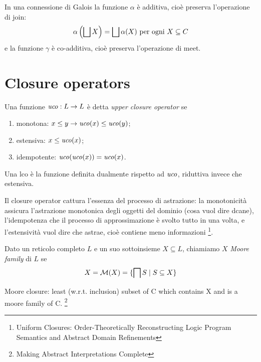 \begin{theorem}
In una connessione di Galois la funzione $\alpha$ è additiva, cioè preserva l'operazione di join: 
$$\alpha\left(\join[X]\right) = \join[\alpha(X)] \text{ per ogni } X \subseteq C$$
e la funzione $\gamma$ è co-additiva, cioè preserva l'operazione di meet.
\end{theorem}

\section{Closure operators}

\begin{definition}
Una funzione $\mathit{uco}: L \to L$ è detta \emph{upper closure operator} se
\begin{enumerate}
    \item monotona: $x \le y \to \mathit{uco}(x) \le \mathit{uco}(y)$;
    \item estensiva: $x \le \mathit{uco}(x)$;
    \item idempotente: $\mathit{uco}(\mathit{uco}(x)) = \mathit{uco}(x)$.
\end{enumerate}
\end{definition}

\begin{definition}
Una $\mathrm{lco}$ è la funzione definita dualmente rispetto ad $\mathit{uco}$, riduttiva invece che estensiva.
\end{definition}

Il closure operator cattura l'essenza del processo di astrazione: la monotonicità assicura l'astrazione monotonica degli oggetti del dominio (cosa vuol dire dcane), l'idempotenza che il processo di approssimazione è svolto tutto in una volta, e l'estensività vuol dire che astrae, cioè contiene meno informazioni \footnote{Uniform Closures: Order-Theoretically Reconstructing Logic Program Semantics and Abstract Domain Refinements}.

\begin{definition}
Dato un reticolo completo $L$ e un suo sottoinsieme $X \subseteq L$, chiamiamo $X$ \emph{Moore family} di $L$ se 
$$X = \mathcal{M}(X) = \{ \meet[S] \; | \; S \subseteq X \}$$
\end{definition}

Moore closure: least (w.r.t. inclusion) subset of C which contains X and is a moore family of C. \footnote{Making Abstract Interpretations Complete}

